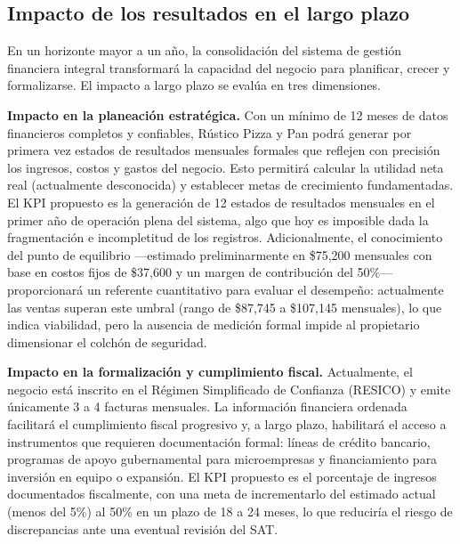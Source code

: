 \documentclass[12pt,letterpaper]{article}
\begin{document}
\subsection{Impacto de los resultados en el largo plazo}

En un horizonte mayor a un año, la consolidación del sistema de gestión financiera integral transformará la capacidad del negocio para planificar, crecer y formalizarse. El impacto a largo plazo se evalúa en tres dimensiones.

\textbf{Impacto en la planeación estratégica.} Con un mínimo de 12 meses de datos financieros completos y confiables, Rústico Pizza y Pan podrá generar por primera vez estados de resultados mensuales formales que reflejen con precisión los ingresos, costos y gastos del negocio. Esto permitirá calcular la utilidad neta real (actualmente desconocida) y establecer metas de crecimiento fundamentadas. El KPI propuesto es la generación de 12 estados de resultados mensuales en el primer año de operación plena del sistema, algo que hoy es imposible dada la fragmentación e incompletitud de los registros. Adicionalmente, el conocimiento del punto de equilibrio ---estimado preliminarmente en \$75,200 mensuales con base en costos fijos de \$37,600 y un margen de contribución del 50\%--- proporcionará un referente cuantitativo para evaluar el desempeño: actualmente las ventas superan este umbral (rango de \$87,745 a \$107,145 mensuales), lo que indica viabilidad, pero la ausencia de medición formal impide al propietario dimensionar el colchón de seguridad.

\textbf{Impacto en la formalización y cumplimiento fiscal.} Actualmente, el negocio está inscrito en el Régimen Simplificado de Confianza (RESICO) y emite únicamente 3 a 4 facturas mensuales. La información financiera ordenada facilitará el cumplimiento fiscal progresivo y, a largo plazo, habilitará el acceso a instrumentos que requieren documentación formal: líneas de crédito bancario, programas de apoyo gubernamental para microempresas y financiamiento para inversión en equipo o expansión. El KPI propuesto es el porcentaje de ingresos documentados fiscalmente, con una meta de incrementarlo del estimado actual (menos del 5\%) al 50\% en un plazo de 18 a 24 meses, lo que reduciría el riesgo de discrepancias ante una eventual revisión del SAT.
\end{document}
